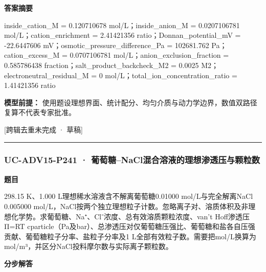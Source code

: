 \documentclass[UTF8,11pt,a4paper]{ctexart}
\begin{document}
\noindent\textbf{答案摘要}\par
inside\_cation\_M = 0.120710678 mol/L；inside\_anion\_M = 0.0207106781 mol/L；cation\_enrichment = 2.41421356 ratio；Donnan\_potential\_mV = -22.6447606 mV；osmotic\_pressure\_difference\_Pa = 102681.762 Pa；cation\_excess\_M = 0.0707106781 mol/L；anion\_exclusion\_fraction = 0.585786438 fraction；salt\_product\_backcheck\_M2 = 0.0025 M2；electroneutral\_residual\_M = 0 mol/L；total\_ion\_concentration\_ratio = 1.41421356 ratio\par
\noindent\textbf{模型前提：}
使用题设理想界面、统计配分、均匀介质与动力学边界，数值双路径复算不代表专家批准。\par
\noindent\textcolor{red!65!black}{[跨辑去重未完成 · 草稿]} \par
\medskip\hrule\medskip
{}
\subsubsection*{UC-ADV15-P241 · 葡萄糖–NaCl混合溶液的理想渗透压与颗粒数}
\noindent\textbf{题目}\par
298.15 K、1.000 L理想稀水溶液含不解离葡萄糖0.01000 mol/L与完全解离NaCl 0.005000 mol/L，NaCl按两个独立理想粒子计数。忽略离子对、溶质体积及非理想化学势。求葡萄糖、Na⁺、Cl⁻浓度、总有效溶质颗粒浓度、van't Hoff渗透压Π=RT cparticle（Pa及bar）、总渗透压对仅葡萄糖压强比、葡萄糖和盐各自压强贡献、葡萄糖粒子分率、盐粒子分率及1 L全部有效粒子数。需要把mol/L换算为mol/m³，并区分NaCl投料摩尔数与实际离子颗粒数。\par
\medskip\noindent\textbf{分步解答}
\end{document}
